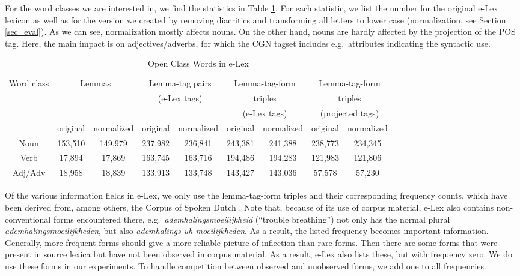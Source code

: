 \documentclass[a4paper,10pt,twoside]{article}
\begin{document}
For the word classes we are interested in, we find the statistics in Table \ref{tab_elex}. For each statistic, we list the number for the original e-Lex lexicon as well as for the version we created by removing diacritics and transforming all letters to lower case (normalization, see Section \ref{sec_eval}). As we can see, normalization mostly affects nouns. On the other hand, nouns are hardly affected by the projection of the POS tag. Here, the main impact is on adjectives/adverbs, for which the CGN tagset includes e.g.\ attributes indicating the syntactic use. 

\begin{table}[tbh]
\tabcolsep=0.11cm
\begin{center}
\begin{tabular}{|c|cc|cc|cc|cc|}
\hline
Word class & \multicolumn{2}{|c|}{Lemmas}  & \multicolumn{2}{|c|}{Lemma-tag pairs} & \multicolumn{2}{|c|}{Lemma-tag-form} & \multicolumn{2}{|c|}{Lemma-tag-form} \\
 & \multicolumn{2}{|c|}{}  & \multicolumn{2}{|c|}{(e-Lex tags)} & \multicolumn{2}{|c|}{triples} & \multicolumn{2}{|c|}{triples} \\
  & \multicolumn{2}{|c|}{}  & \multicolumn{2}{|c|}{} & \multicolumn{2}{|c|}{(e-Lex tags)} & \multicolumn{2}{|c|}{(projected tags)} \\
  & original & normalized & original & normalized & original & normalized & original & normalized \\
\hline
Noun    & 153,510 & 149,979 & 237,982 & 236,841 & 243,381 & 241,388 & 238,773 & 234,345 \\
Verb    & 17,894  & 17,869  & 163,745 & 163,716 & 194,486 & 194,283 & 121,983 & 121,806 \\
Adj/Adv & 18,958  & 18,839  & 133,913 & 133,748 & 143,427 & 143,036 & 57,578  & 57,230 \\
\hline

\end{tabular}

\caption{Open Class Words in e-Lex}
\label{tab_elex}
\end{center}
\end{table}


Of the various information fields in e-Lex, we only use the lemma-tag-form triples and their corresponding frequency counts, which have been derived from, among others, the Corpus of Spoken Dutch . Note that, because of its use of corpus material, e-Lex also contains non-conventional forms encountered there, e.g.\ \textit{ademhalingsmoeilijkheid} (``trouble breathing'') not only has the normal plural \textit{ademhalingsmoeilijkheden}, but also \textit{ademhalings-uh-moeilijkheden}. As a result, the listed frequency becomes important information. Generally, more frequent forms should give a more reliable picture of inflection than rare forms. Then there are some forms that were present in source lexica but have not been observed in corpus material. As a result, e-Lex also lists these, but with frequency zero. We do use these forms in our experiments. To handle competition between observed and unobserved forms, we add one to all frequencies.
\end{document}
